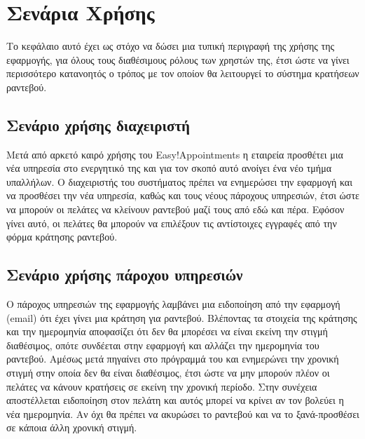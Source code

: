
\chapter{Σενάρια Χρήσης}
Το κεφάλαιο αυτό έχει ως στόχο να δώσει μια τυπική περιγραφή της χρήσης της εφαρμογής, για όλους τους διαθέσιμους ρόλους των χρηστών της, έτσι ώστε να γίνει περισσότερο κατανοητός ο τρόπος με τον οποίον θα λειτουργεί το σύστημα κρατήσεων ραντεβού.

\section{Σενάριο χρήσης διαχειριστή}
Μετά από αρκετό καιρό χρήσης του Easy!Appointments η εταιρεία προσθέτει μια νέα υπηρεσία στο ενεργητικό της και για τον σκοπό αυτό ανοίγει ένα νέο τμήμα υπαλλήλων. Ο διαχειριστής του συστήματος πρέπει να ενημερώσει την εφαρμογή και να προσθέσει την νέα υπηρεσία, καθώς και τους νέους πάροχους υπηρεσιών, έτσι ώστε να μπορούν οι πελάτες να κλείνουν ραντεβού μαζί τους από εδώ και πέρα. Εφόσον γίνει αυτό, οι πελάτες θα μπορούν να επιλέξουν τις αντίστοιχες εγγραφές από την φόρμα κράτησης ραντεβού.

\section{Σενάριο χρήσης πάροχου υπηρεσιών}
Ο πάροχος υπηρεσιών της εφαρμογής λαμβάνει μια ειδοποίηση από την εφαρμογή (email) ότι έχει γίνει μια κράτηση για ραντεβού. Βλέποντας τα στοιχεία της κράτησης και την ημερομηνία αποφασίζει ότι δεν θα μπορέσει να είναι εκείνη την στιγμή διαθέσιμος, οπότε συνδέεται στην εφαρμογή και αλλάζει την ημερομηνία του ραντεβού. Αμέσως μετά πηγαίνει στο πρόγραμμά του και ενημερώνει την χρονική στιγμή στην οποία δεν θα είναι διαθέσιμος, έτσι ώστε να μην μπορούν πλέον οι πελάτες να κάνουν κρατήσεις σε εκείνη την χρονική περίοδο. Στην συνέχεια αποστέλλεται ειδοποίηση στον πελάτη και αυτός μπορεί να κρίνει αν τον βολεύει η νέα ημερομηνία. Αν όχι θα πρέπει να ακυρώσει το ραντεβού και να το ξανά-προσθέσει σε κάποια άλλη χρονική στιγμή. 

